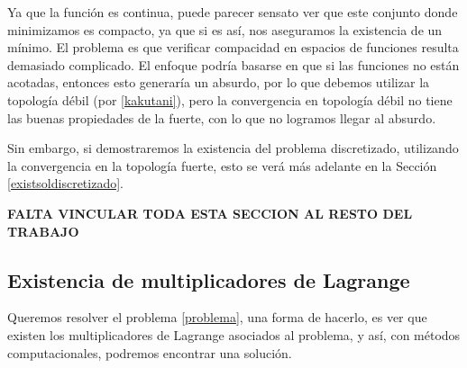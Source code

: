 \documentclass[a4paper,10pt]{book}
\newcommand{\R}{\mathbbm{R}}
\newcommand{\arr}{\rightarrow}
\begin{document}
Ya que la función es continua, puede parecer sensato ver que este conjunto donde minimizamos es compacto, ya que si es así, nos aseguramos la existencia de un mínimo. El problema es que verificar compacidad en espacios de funciones resulta demasiado complicado. El enfoque podría basarse en que si las funciones no están acotadas, entonces esto generaría un absurdo, por lo que debemos utilizar la topología débil (por \eqref{kakutani}), pero la convergencia en topología débil no tiene las buenas propiedades de la fuerte, con lo que no logramos llegar al absurdo.

Sin embargo, si demostraremos la existencia del problema discretizado, utilizando la convergencia en la topología fuerte, esto se verá más adelante en la Sección \eqref{existsoldiscretizado}. 




{\bf FALTA VINCULAR TODA ESTA SECCION AL RESTO DEL TRABAJO}


\subsection{Existencia de multiplicadores de Lagrange}
Queremos resolver el problema \eqref{problema}, una forma de hacerlo, es ver que existen los multiplicadores de Lagrange asociados al problema, y así, con métodos computacionales, podremos encontrar una solución.
\end{document}
